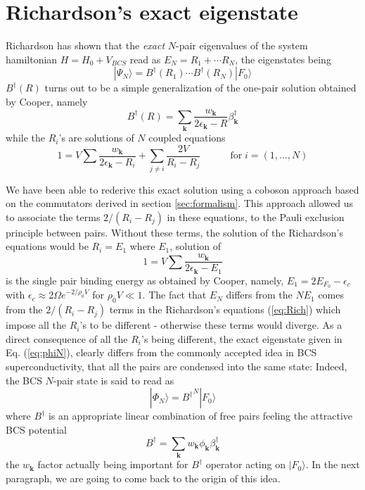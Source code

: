 \documentclass[aps,prb,preprint,groupedaddress,amsmath]{revtex4-1}
\newcommand{\vk}{\ensuremath{\mathbf{k}}}
\newcommand{\dg}{\ensuremath{\dagger}}
\begin{document}
\section{Richardson's exact eigenstate}
Richardson has shown that the \emph{exact} $N$-pair eigenvalues of the system hamiltonian $H=H_0+V_{BCS}$ read as $E_N=R_1+\cdots{}R_N$, the eigenstates being
\begin{equation}\label{eq:phiN}
|\Psi_N{\rangle}=B^{\dagger}(R_1)\cdots{}B^{\dagger}(R_N)|F_0{\rangle}  
\end{equation}
$B^{\dagger}(R)$ turns out to be a simple generalization of the one-pair solution obtained by Cooper, namely
\begin{equation}  \label{eq:B}
B^{\dagger}(R)=\sum_\vk\frac{w_\vk}{2\epsilon_\vk-R}\beta^{\dagger}_\vk
\end{equation}
while the $R_i$'s are solutions of $N$ coupled equations
\begin{equation}\label{eq:Rich}
1=V\sum\frac{w_{\mathbf{k} }}{2\epsilon_{\mathbf{k} }-R_i}+\sum_{j\neq{i}}%
\frac{2V}{R_i-R_j}\quad\qquad \text{for}\; i=\left(1,...,N\right) 
\end{equation}

We have been able to rederive this exact solution using a coboson approach based on the  commutators derived in section \ref{sec:formalism}.  This approach allowed us to associate the terms $2/(R_i-R_j)$ in these equations, to the Pauli exclusion principle between pairs.  Without these terms, the solution of the Richardson's equations would be $R_i=E_1$ where $E_1$, solution of
\begin{equation}
1=V\sum\frac{w_{\mathbf{k} }}{2\epsilon_{\mathbf{k} }-E_1}
\end{equation}
 is the single pair binding energy as obtained by Cooper, namely, $E_1=2E_{F_0}-\epsilon_c$ with $\epsilon_c\approx2\Omega{}e^{-2/\rho_0V}$ for $\rho_0V\ll1$. The fact that $E_N$ differs from the $NE_1$ comes from the $2/(R_i-R_j)$ terms in the Richardson's equations (\ref{eq:Rich})  which impose all the $R_i$'s to be different - otherwise these terms would diverge. As a direct consequence of all the $R_i$'s being different, the exact eigenstate given in Eq. (\ref{eq:phiN}), clearly differs from the commonly accepted idea  in BCS superconductivity, that all the pairs are condensed into the same state:  Indeed, the BCS $N$-pair state is said to read as 
\begin{equation}\label{eq:phiNBcs}
|\Phi_N{\rangle}={B^{\dagger}}^N|F_0{\rangle}  
\end{equation}
where $B^\dagger$ is an appropriate linear combination of free pairs feeling the attractive BCS potential
\begin{equation}\label{eq:bBeta}
B^\dg=\sum_\vk w_{\mathbf{k} }\phi_\vk\beta^\dg_\vk
\end{equation}
the $w_{\mathbf{k} }$ factor actually being important for $B^\dg$ operator acting on $|F_0{\rangle}$. In the next paragraph, we are going to come back to the origin of this idea.  
\end{document}
